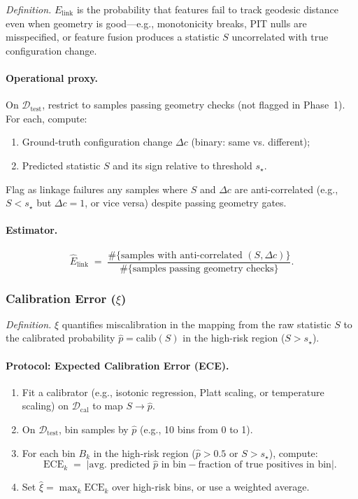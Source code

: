 \documentclass[11pt]{article}
\begin{document}
\emph{Definition.} $E_{\mathrm{link}}$ is the probability that features fail to track geodesic distance even when geometry is good—e.g., monotonicity breaks, PIT nulls are misspecified, or feature fusion produces a statistic $S$ uncorrelated with true configuration change.

\paragraph{Operational proxy.}
On $\mathcal{D}_{\mathrm{test}}$, restrict to samples passing geometry checks (not flagged in Phase~1). For each, compute:
\begin{enumerate}[label=(\alph*),leftmargin=*]
  \item Ground-truth configuration change $\Delta c$ (binary: same vs. different);
  \item Predicted statistic $S$ and its sign relative to threshold $s_\star$.
\end{enumerate}
Flag as linkage failures any samples where $S$ and $\Delta c$ are anti-correlated (e.g., $S < s_\star$ but $\Delta c = 1$, or vice versa) despite passing geometry gates.

\paragraph{Estimator.}
\[
\hat E_{\mathrm{link}}
\;=\;
\frac{\#\{\text{samples with anti-correlated }(S, \Delta c)\}}{\#\{\text{samples passing geometry checks}\}}.
\]

\subsubsection{Calibration Error ($\xi$)}
\label{subsubsec:xi}

\emph{Definition.} $\xi$ quantifies miscalibration in the mapping from the raw statistic $S$ to the calibrated probability $\hat p = \text{calib}(S)$ in the high-risk region ($S > s_\star$).

\paragraph{Protocol: Expected Calibration Error (ECE).}
\begin{enumerate}[label=\arabic*.,leftmargin=*]
  \item Fit a calibrator (e.g., isotonic regression, Platt scaling, or temperature scaling) on $\mathcal{D}_{\mathrm{cal}}$ to map $S \to \hat p$.
  \item On $\mathcal{D}_{\mathrm{test}}$, bin samples by $\hat p$ (e.g., 10 bins from 0 to 1).
  \item For each bin $B_k$ in the high-risk region ($\hat p > 0.5$ or $S > s_\star$), compute:
  \[
  \text{ECE}_k
  \;=\;
  \bigl|\text{avg. predicted } \hat p \text{ in bin} - \text{fraction of true positives in bin}\bigr|.
  \]
  \item Set $\hat\xi = \max_k \text{ECE}_k$ over high-risk bins, or use a weighted average.
\end{enumerate}
\end{document}
